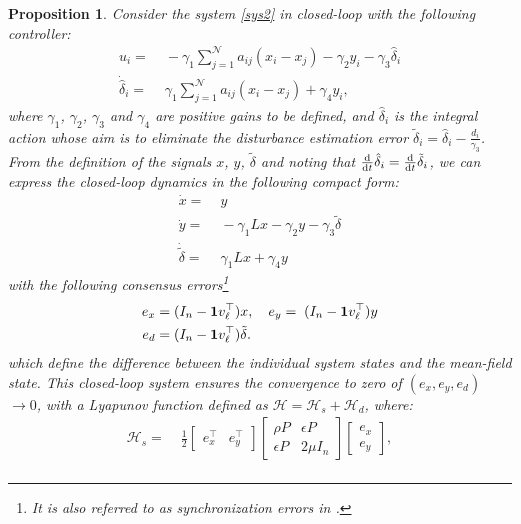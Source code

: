 \documentclass[journal,twoside]{IEEEtran}
\newtheorem{proposition}{Proposition}
\begin{document}
  
\begin{proposition}   \em
\label{pro1}
  Consider the system \eqref{sys2} in closed-loop with the following controller: 
  \begin{align}
u_i= &\; -\gamma_1 \sum\limits_{j=1}^{\mathcal N} a_{ij} (x_i-x_j)-\gamma_2 y_i  -\gamma_3 \hat \delta_i \nonumber  \\
\dot {\hat \delta}_i= &\; \gamma_1 \sum\limits_{j=1}^{\mathcal N} a_{ij} (x_i-x_j)+\gamma_4 y_i, 
\label{intc2}
\end{align}
where  $\gamma_1$, $\gamma_2$, $\gamma_3$ and $\gamma_4$ are positive gains to be defined, and $\hat \delta_i$ is the integral action whose aim is to eliminate the disturbance estimation error $\tilde \delta_i = \hat \delta_i-\frac{d_i}{\gamma_3}$. 
From the definition of the signals $x$, $y$, $\tilde \delta$
and noting that $\frac{\rm d}{{\rm d}t}{\hat\delta}_i = \frac{\rm d}{{\rm d}t} {\tilde\delta}_i$, we can express the closed-loop dynamics in the following compact form:
\begin{align}
\label{tilsys2}
\dot x=& \; y \nonumber \\
\dot y =& \; -\gamma_1 L x-\gamma_2 y - \gamma_3 \tilde \delta \nonumber \\
\dot {\tilde \delta}= & \; \gamma_1 L x +\gamma_4 y
\end{align}
with the following consensus errors\footnote{It is also referred to as synchronization errors in \cite{PANLOR17}.}
\begin{align}
\label{err2}
e_x=&\;(I_n-{\bf 1} v_\ell^\top) x, \quad e_y=\;(I_n-{\bf 1} v_\ell^\top) y \nonumber \\
e_d=&\;(I_n-{\bf 1} v_\ell^\top) \tilde \delta .
\end{align}  
which define the difference between the individual system states and the mean-field state.
This closed-loop system ensures the convergence to zero of $(e_x, e_y, e_d)$ $\to 0$, with a Lyapunov function defined as ${\mathcal H}= {\mathcal H}_s + {\mathcal H}_d$, where: 
 \begin{align}
 {\mathcal H}_s =& \; \frac{1}{2}  \left[ \begin{array}{cc} e_x^\top  & e_y^\top  \end{array} \right]\left[ \begin{array}{cc} \rho P &  \epsilon P \\ \epsilon P & 2 \mu I_n \end{array} \right]   \left[ \begin{array}{c} e_x \\ e_y  \end{array} \right], \nonumber \\

\end{align}
\end{proposition}
\end{document}

